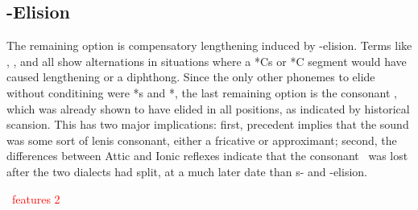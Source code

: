 
\subsection{\W-Elision}\label{subsec:WElision}
The remaining option is compensatory lengthening induced by \w-elision. Terms like ,
, and  all show alternations in situations where a *Cs or *C\textel{\yod} segment
would have caused lengthening or a diphthong. Since the only other phonemes to elide without conditining
were *s and *\textel{\yod}, the last remaining option is the consonant \w, which was already shown to have
elided in all positions, as indicated by historical scansion. This has two major implications: first,
precedent implies that the sound was some sort of lenis consonant, either a fricative or approximant;
second, the differences between Attic and Ionic reflexes indicate that the consonant \w\ was lost
after the two dialects had split, at a much later date than s- and \textel{\yod}-elision.

\textcolor{red}{\w\ features 2}

